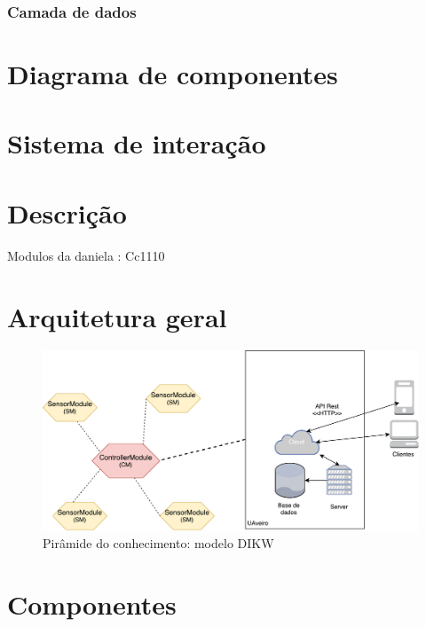 \subsubsection{Camada de dados}




\section{Diagrama de componentes}




\section{Sistema de interação}


\section{Descrição}


Modulos da daniela : Cc1110



\section{Arquitetura geral}

\begin{figure}[!htb]
	\centering
	\includegraphics[scale=0.55]{esquemas/arquitetura_geral.pdf}
	\caption{Pirâmide do conhecimento: modelo DIKW}
	\label{dikw}
\end{figure}


\newpage


\section{Componentes}



